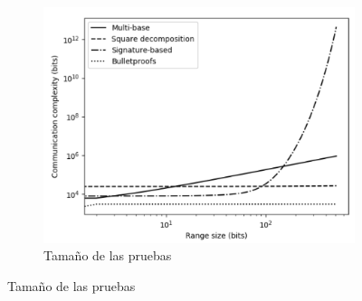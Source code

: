 \begin{figure}[H]
    \centering
    \begin{subfigure}[c]{0.45\textwidth}
        \includegraphics[width=\textwidth]{images/proofsSize.png}
        \caption{Tamaño de las pruebas}
    \end{subfigure}
    

\end{figure}
